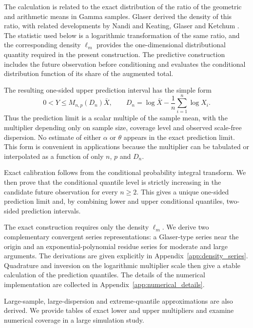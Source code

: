 \documentclass[11pt]{article}
\theoremstyle{remark}
\begin{document}
The calculation is related to the exact distribution of the ratio of the geometric and arithmetic 
means in Gamma samples. Glaser \cite{Glaser1976} derived the density of this ratio, with related 
developments by Nandi \cite{Nandi1980} and Keating, Glaser and Ketchum \cite{Keating1990}. 
The statistic used below is a logarithmic transformation of the same ratio, 
and the corresponding density $\ell_m$ provides the one-dimensional distributional 
quantity required in the present construction. 
The predictive construction includes the future observation before conditioning and evaluates the conditional distribution function of its share of the augmented total.

The resulting one-sided upper prediction interval has the simple form
\begin{equation}
 0<Y\le M_{n,p}(D_n)\bar X,
 \qquad
 D_n=\log\bar X-\frac1n\sum_{i=1}^n\log X_i.
 \label{eq:intro_interval_form}
\end{equation}
Thus the prediction limit is a scalar multiple of the sample mean, with the multiplier depending only on sample size, 
coverage level and observed scale-free dispersion. No estimate of either $\alpha$ or $\theta$ appears 
in the exact prediction limit. This form is convenient in applications because the multiplier 
can be tabulated or interpolated as a function of only $n$, $p$ and $D_n$.

Exact calibration follows from the conditional probability integral transform. 
We then prove that the conditional quantile level is strictly increasing in the candidate future observation 
for every $n\ge2$. This gives a unique one-sided prediction limit and, by combining lower and upper conditional quantiles, two-sided prediction intervals.

The exact construction requires only the density $\ell_m$. We derive two complementary convergent series representations: a Glaser-type series near the origin and an exponential-polynomial residue series for moderate and large arguments. 
The derivations are given explicitly in Appendix~\ref{app:density_series}. Quadrature and inversion on the 
logarithmic multiplier scale then give a stable calculation of the prediction quantiles. The details of the numerical implementation 
are collected in Appendix~\ref{app:numerical_details}. 

Large-sample, large-dispersion and extreme-quantile approximations are also derived. We provide tables of exact lower and upper multipliers and examine numerical coverage in a large simulation study.
\end{document}
